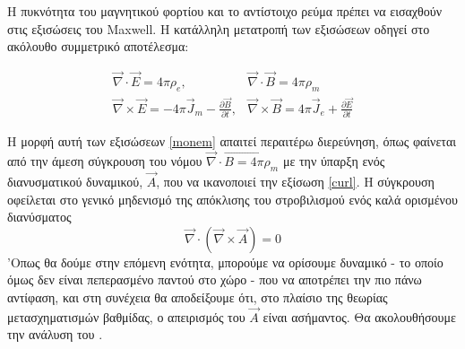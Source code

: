 \noindent Η πυκνότητα του μαγνητικού φορτίου και το αντίστοιχο ρεύμα πρέπει να εισαχθούν στις εξισώσεις του Maxwell. Η κατάλληλη μετατροπή των εξισώσεων οδηγεί στο ακόλουθο συμμετρικό   αποτέλεσμα:

\begin{equation}\label{monem}
    \begin{array}{ll}
        \vec{\nabla} \cdot \Vec{E} = 4\pi \rho_e, & \vec{\nabla} \cdot \Vec{B} = 4\pi \rho_m \\
        \vec{\nabla} \times \vec{E} = - 4\pi \Vec{J}_m - \frac{\partial \Vec{B}}{\partial t}, & \vec{\nabla} \times \vec{B} = 4\pi \Vec{J}_e + \frac{\partial \Vec{E}}{\partial t}
    \end{array}
\end{equation}

\noindent Η μορφή αυτή των εξισώσεων \eqref{monem} απαιτεί περαιτέρω διερεύνηση, όπως φαίνεται από την άμεση σύγκρουση του νόμου $\vec{\nabla}\cdot\vec{B = 4\pi\rho_m}$ με την ύπαρξη ενός διανυσματικού δυναμικού, $\vec{A}$, που να ικανοποιεί την εξίσωση \eqref{curl}. Η σύγκρουση οφείλεται στο γενικό μηδενισμό της απόκλισης του στροβιλισμού ενός καλά ορισμένου διανύσματος
\begin{equation*}
    \vec{\nabla}\cdot\left(\vec{\nabla}\times\vec{A}\right) = 0
\end{equation*}
'Οπως θα δούμε στην επόμενη ενότητα, μπορούμε να ορίσουμε δυναμικό - το οποίο όμως δεν είναι πεπερασμένο παντού στο χώρο - που να αποτρέπει την πιο πάνω αντίφαση, και στη συνέχεια θα αποδείξουμε ότι, στο πλαίσιο της θεωρίας μετασχηματισμών βαθμίδας, ο απειρισμός του $\vec{A}$ είναι ασήμαντος. Θα ακολουθήσουμε την ανάλυση του \cite{Jackson:100964}.